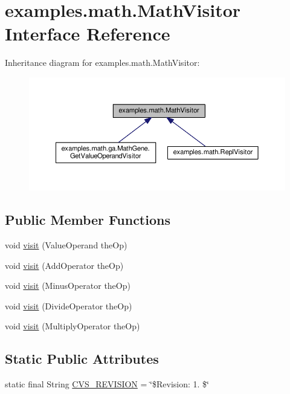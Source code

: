 \hypertarget{interfaceexamples_1_1math_1_1_math_visitor}{\section{examples.\-math.\-Math\-Visitor Interface Reference}
\label{interfaceexamples_1_1math_1_1_math_visitor}
}


Inheritance diagram for examples.\-math.\-Math\-Visitor\-:
\nopagebreak
\begin{figure}[H]
\begin{center}
\leavevmode
\includegraphics[width=350pt]{interfaceexamples_1_1math_1_1_math_visitor__inherit__graph}
\end{center}
\end{figure}
\subsection*{Public Member Functions}
\begin{DoxyCompactItemize}
\item 
void \hyperlink{interfaceexamples_1_1math_1_1_math_visitor_a6ad5892763da2667cb1c89493117b8dc}{visit} (Value\-Operand the\-Op)
\item 
void \hyperlink{interfaceexamples_1_1math_1_1_math_visitor_a981689943ccbcc5bad9f3ea9d72e2ebe}{visit} (Add\-Operator the\-Op)
\item 
void \hyperlink{interfaceexamples_1_1math_1_1_math_visitor_a08e1b8e8b36df51d70565010d102f2d6}{visit} (Minus\-Operator the\-Op)
\item 
void \hyperlink{interfaceexamples_1_1math_1_1_math_visitor_ae90e3c8a4382d2c6961f41c788b80771}{visit} (Divide\-Operator the\-Op)
\item 
void \hyperlink{interfaceexamples_1_1math_1_1_math_visitor_ae779c98f4caff76ba24741a447f01cdd}{visit} (Multiply\-Operator the\-Op)
\end{DoxyCompactItemize}
\subsection*{Static Public Attributes}
\begin{DoxyCompactItemize}
\item 
static final String \hyperlink{interfaceexamples_1_1math_1_1_math_visitor_a07b21d76830258839530779d30a00c2e}{C\-V\-S\-\_\-\-R\-E\-V\-I\-S\-I\-O\-N} = \char`\"{}\$Revision\-: 1. \$\char`\"{}
\end{DoxyCompactItemize}


